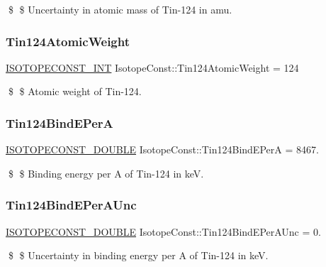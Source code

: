\$ \$ Uncertainty in atomic mass of Tin-\/124 in amu. \mbox{\label{group___isotope_const-_tin-_sn124_ga9e7696b5282b9a0d37e4e047a2ea6e5f}} 
\subsubsection{\texorpdfstring{Tin124\+Atomic\+Weight}{Tin124AtomicWeight}}
{\footnotesize\ttfamily \mbox{\hyperlink{group___isotope_const-_macros_ga5f18360b3e99483a35c32d789e62621c}{I\+S\+O\+T\+O\+P\+E\+C\+O\+N\+S\+T\+\_\+\+I\+NT}} Isotope\+Const\+::\+Tin124\+Atomic\+Weight = 124}

\$ \$ Atomic weight of Tin-\/124. \mbox{\label{group___isotope_const-_tin-_sn124_gaa46706c7c758063fd1c94907c5188a13}} 
\subsubsection{\texorpdfstring{Tin124\+Bind\+E\+PerA}{Tin124BindEPerA}}
{\footnotesize\ttfamily \mbox{\hyperlink{group___isotope_const-_macros_ga8f45a7272ce02c0b4c65c44636ed719a}{I\+S\+O\+T\+O\+P\+E\+C\+O\+N\+S\+T\+\_\+\+D\+O\+U\+B\+LE}} Isotope\+Const\+::\+Tin124\+Bind\+E\+PerA = 8467.}

\$ \$ Binding energy per A of Tin-\/124 in keV. \mbox{\label{group___isotope_const-_tin-_sn124_gafa387daf114a3b6637ca974cdf925389}} 
\subsubsection{\texorpdfstring{Tin124\+Bind\+E\+Per\+A\+Unc}{Tin124BindEPerAUnc}}
{\footnotesize\ttfamily \mbox{\hyperlink{group___isotope_const-_macros_ga8f45a7272ce02c0b4c65c44636ed719a}{I\+S\+O\+T\+O\+P\+E\+C\+O\+N\+S\+T\+\_\+\+D\+O\+U\+B\+LE}} Isotope\+Const\+::\+Tin124\+Bind\+E\+Per\+A\+Unc = 0.}

\$ \$ Uncertainty in binding energy per A of Tin-\/124 in keV. \mbox{\label{group___isotope_const-_tin-_sn124_ga68f5b09496522caf38c0eba2d129e189}} 
